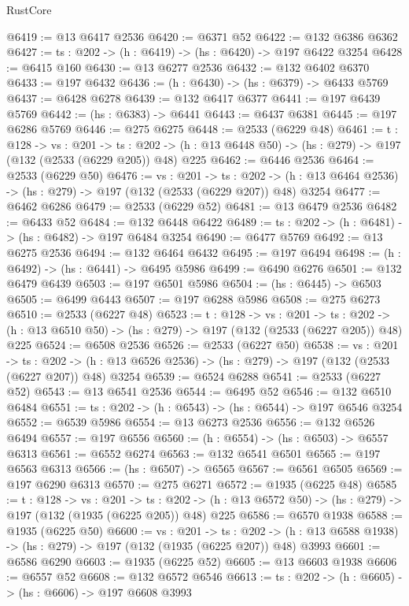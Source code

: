 \begin{lexlean}{RustCore}
\begin{coremodule}
@6419 := @13 @6417 @2536
@6420 := @6371 @52
@6422 := @132 @6386 @6362
@6427 := {ts : @202} -> (h : @6419) -> (hs : @6420) -> @197 @6422 @3254
@6428 := @6415 @160
@6430 := @13 @6277 @2536
@6432 := @132 @6402 @6370
@6433 := @197 @6432
@6436 := (h : @6430) -> (hs : @6379) -> @6433 @5769
@6437 := @6428 @6278
@6439 := @132 @6417 @6377
@6441 := @197 @6439 @5769
@6442 := (hs : @6383) -> @6441
@6443 := @6437 @6381
@6445 := @197 @6286 @5769
@6446 := @275 @6275
@6448 := @2533 (@6229 @48)
@6461 := {t : @128} ->
  {vs : @201} ->
  {ts : @202} -> (h : @13 @6448 @50) -> (hs : @279) -> @197 (@132 (@2533 (@6229 @205)) @48) @225
@6462 := @6446 @2536
@6464 := @2533 (@6229 @50)
@6476 := {vs : @201} ->
  {ts : @202} -> (h : @13 @6464 @2536) -> (hs : @279) -> @197 (@132 (@2533 (@6229 @207)) @48) @3254
@6477 := @6462 @6286
@6479 := @2533 (@6229 @52)
@6481 := @13 @6479 @2536
@6482 := @6433 @52
@6484 := @132 @6448 @6422
@6489 := {ts : @202} -> (h : @6481) -> (hs : @6482) -> @197 @6484 @3254
@6490 := @6477 @5769
@6492 := @13 @6275 @2536
@6494 := @132 @6464 @6432
@6495 := @197 @6494
@6498 := (h : @6492) -> (hs : @6441) -> @6495 @5986
@6499 := @6490 @6276
@6501 := @132 @6479 @6439
@6503 := @197 @6501 @5986
@6504 := (hs : @6445) -> @6503
@6505 := @6499 @6443
@6507 := @197 @6288 @5986
@6508 := @275 @6273
@6510 := @2533 (@6227 @48)
@6523 := {t : @128} ->
  {vs : @201} ->
  {ts : @202} -> (h : @13 @6510 @50) -> (hs : @279) -> @197 (@132 (@2533 (@6227 @205)) @48) @225
@6524 := @6508 @2536
@6526 := @2533 (@6227 @50)
@6538 := {vs : @201} ->
  {ts : @202} -> (h : @13 @6526 @2536) -> (hs : @279) -> @197 (@132 (@2533 (@6227 @207)) @48) @3254
@6539 := @6524 @6288
@6541 := @2533 (@6227 @52)
@6543 := @13 @6541 @2536
@6544 := @6495 @52
@6546 := @132 @6510 @6484
@6551 := {ts : @202} -> (h : @6543) -> (hs : @6544) -> @197 @6546 @3254
@6552 := @6539 @5986
@6554 := @13 @6273 @2536
@6556 := @132 @6526 @6494
@6557 := @197 @6556
@6560 := (h : @6554) -> (hs : @6503) -> @6557 @6313
@6561 := @6552 @6274
@6563 := @132 @6541 @6501
@6565 := @197 @6563 @6313
@6566 := (hs : @6507) -> @6565
@6567 := @6561 @6505
@6569 := @197 @6290 @6313
@6570 := @275 @6271
@6572 := @1935 (@6225 @48)
@6585 := {t : @128} ->
  {vs : @201} ->
  {ts : @202} -> (h : @13 @6572 @50) -> (hs : @279) -> @197 (@132 (@1935 (@6225 @205)) @48) @225
@6586 := @6570 @1938
@6588 := @1935 (@6225 @50)
@6600 := {vs : @201} ->
  {ts : @202} -> (h : @13 @6588 @1938) -> (hs : @279) -> @197 (@132 (@1935 (@6225 @207)) @48) @3993
@6601 := @6586 @6290
@6603 := @1935 (@6225 @52)
@6605 := @13 @6603 @1938
@6606 := @6557 @52
@6608 := @132 @6572 @6546
@6613 := {ts : @202} -> (h : @6605) -> (hs : @6606) -> @197 @6608 @3993

\end{coremodule}
\end{lexlean}
